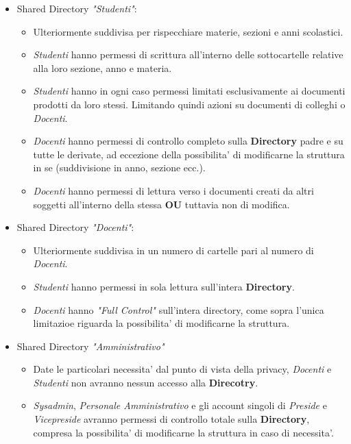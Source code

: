 \documentclass{report}
\begin{document}
            \begin{itemize}
            \item Shared Directory \textit{"Studenti"}:
                \begin{itemize}
                    \item Ulteriormente suddivisa per rispecchiare materie, sezioni e anni scolastici.
                    \item \emph{Studenti} hanno permessi di scrittura all'interno delle sottocartelle relative
                        alla loro sezione, anno e materia.
                    \item \emph{Studenti} hanno in ogni caso permessi limitati esclusivamente ai documenti
                        prodotti da loro stessi. Limitando quindi azioni su documenti di colleghi o \emph{Docenti}.
                    \item \emph{Docenti} hanno permessi di controllo completo sulla \textbf{Directory} padre
                        e su tutte le derivate, ad eccezione della possibilita' di modificarne la struttura in se
                        (suddivisione in anno, sezione ecc.).
                    \item \emph{Docenti} hanno permessi di lettura verso i documenti creati da altri soggetti
                        all'interno della stessa \textbf{OU} tuttavia non di modifica.
                \end{itemize}
            \item Shared Directory \textit{"Docenti"}:
                \begin{itemize}
                    \item Ulteriormente suddivisa in un numero di cartelle pari al numero di \emph{Docenti}.
                    \item \emph{Studenti} hanno permessi in sola lettura sull'intera \textbf{Directory}.
                    \item \emph{Docenti} hanno \emph{"Full Control"} sull'intera directory, come sopra 
                        l'unica limitazioe riguarda la possibilita' di modificarne la struttura.
                \end{itemize}
            \item Shared Directory \textit{"Amministrativo"}
                \begin{itemize}
                    \item Date le particolari necessita' dal punto di vista della privacy, \emph{Docenti} e
                     \emph{Studenti} non avranno nessun accesso alla \textbf{Direcotry}.
                    \item \emph{Sysadmin}, \emph{Personale Amministrativo} e gli account singoli di
                     \emph{Preside} e \emph{Vicepreside} avranno permessi di controllo totale sulla
                     \textbf{Directory}, compresa la possibilita' di modificarne la struttura in caso
                     di necessita'.
                \end{itemize}
            \end{itemize}
\end{document}
